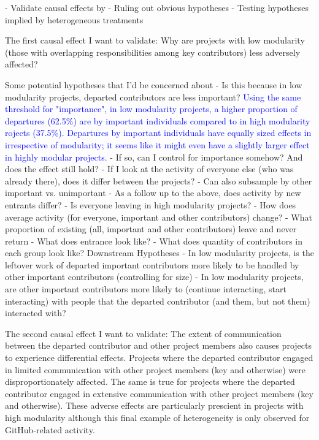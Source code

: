 - Validate causal effects by
  - Ruling out obvious hypotheses
  - Testing hypotheses implied by heterogeneous treatments


The first causal effect I want to validate: 
Why are projects with low modularity (those with overlapping responsibilities among key contributors) less adversely affected?

Some potential hypotheses that I'd be concerned about
- Is this because in low modularity projects, departed contributors are less important? \textcolor{blue}{Using the same threshold for "importance", in low modularity projects, a higher proportion of departures (62.5\%) are by important individuals compared to in high modularity rojects (37.5\%). Departures by important individuals have equally sized effects in irrespective of modularity; it seems like it might even have a slightly larger effect in highly modular projects. }
  - If so, can I control for importance somehow? And does the effect still hold? 
  - If I look at the activity of everyone else (who was already there), does it differ between the projects?
    - Can also subsample by other important vs. unimportant
  - As a follow up to the above, does activity by new entrants differ?
- Is everyone leaving in high modularity projects?
  - How does average activity (for everyone, important and other contributors) change?
  - What proportion of existing (all, important and other contributors) leave and never return
    - What does entrance look like?
  - What does quantity of contributors in each group look like?
Downstream Hypotheses
- In low modularity projects, is the leftover work of departed important contributors more likely to be handled by other important contributors (controlling for size)
- In low modularity projects, are other important contributors more likely to (continue interacting, start interacting) with people that the departed contributor (and them, but not them) interacted with?

The second causal effect I want to validate: 
The extent of communication between the departed contributor and other project members also causes projects to experience differential effects. Projects where the departed contributor engaged in limited communication with other project members (key and otherwise) were disproportionately affected. The same is true for projects where the departed contributor engaged in extensive communication with other project members (key and otherwise). These adverse effects are particularly prescient in projects with high modularity although this final example of heterogeneity is only observed for GitHub-related activity. 

